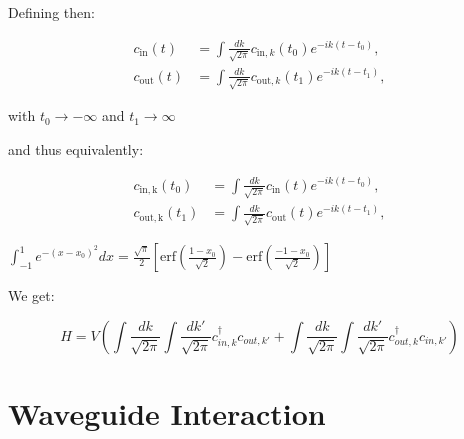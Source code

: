 Defining then: 

\begin{align}
c_{\mathrm{in}}(t) & =\int \frac{d k}{\sqrt{2 \pi}} c_{\mathrm{in}, k}\left(t_0\right) e^{-i k\left(t-t_0\right)}, \\
c_{\mathrm{out}}(t) & =\int \frac{d k}{\sqrt{2 \pi}} c_{\mathrm{out}, k}\left(t_1\right) e^{-i k\left(t-t_1\right)},
\end{align}

with $t_0 \rightarrow - \infty$ and $t_1 \rightarrow \infty$

and thus equivalently:

\begin{align}
c_{\mathrm{in,k}}\left(t_0\right) & =\int \frac{d k}{\sqrt{2 \pi}} c_{\mathrm{in}}(t) e^{-i k\left(t-t_0\right)}, \\
c_{\mathrm{out,k}}\left(t_1\right) & =\int \frac{d k}{\sqrt{2 \pi}} c_{\mathrm{out}}(t) e^{-i k\left(t-t_1\right)},
\end{align}

$\int_{-1}^{1} e^{-(x-x_0)^2} dx = \frac{\sqrt{\pi}}{2} \left[ \mathrm{erf}\left(\frac{1-x_0}{\sqrt{2}}\right) - \mathrm{erf}\left(\frac{-1-x_0}{\sqrt{2}}\right) \right]
$


We get:

\begin{equation}
    H =  V \left ( \int \frac{dk}{\sqrt{2 \pi}} \int \frac{dk'}{\sqrt{2 \pi}} c_{in,k}^\dagger c_{out,k'} + \int \frac{dk}{\sqrt{2 \pi}} \int \frac{dk'}{\sqrt{2 \pi}} c_{out,k}^\dagger c_{in,k'} \right )
\end{equation}


\section{Waveguide Interaction}

